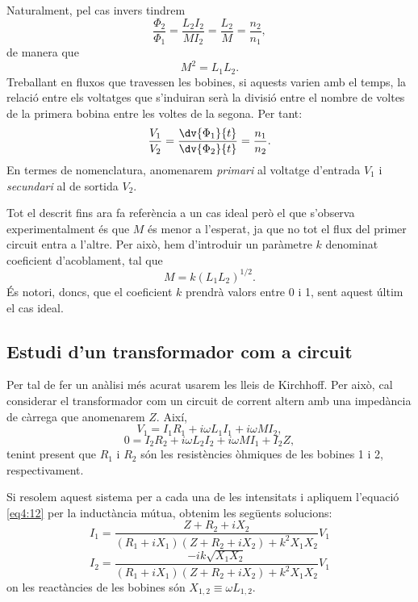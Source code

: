 \documentclass[a4paper,10.5pt]{report}
\begin{document}
Naturalment, pel cas invers tindrem
\begin{equation}
	\frac{\Phi_2}{\Phi_1}=\frac{L_2I_2}{MI_2}=\frac{L_2}{M}=\frac{n_2}{n_1}, \label{eq:4:9}
\end{equation}
de manera que
\begin{equation}
	M^2=L_1L_2. \label{eq:4:10}
\end{equation}
Treballant en fluxos que travessen les bobines, si aquests varien amb el temps, la relació entre els voltatges que s'induiran serà la divisió entre el nombre de voltes de la primera bobina entre les voltes de la segona. Per tant:
\begin{equation}
	\frac{V_1}{V_2}=\frac{\dv{\Phi_1}{t}}{\dv{\Phi_2}{t}}=\frac{n_1}{n_2}. \label{eq4:11}
\end{equation}
En termes de nomenclatura, anomenarem \textit{primari} al voltatge d'entrada $V_1$ i \textit{secundari} al de sortida $V_2$.

Tot el descrit fins ara fa referència a un cas ideal però el que s'observa experimentalment és que $M$ és menor a l'esperat, ja que no tot el flux del primer circuit entra a l'altre. Per això, hem d'introduir un paràmetre $k$ denominat coeficient d'acoblament, tal que
\begin{equation}
	M=k(L_1L_2)^{1/2}. \label{eq4:12}
\end{equation}
És notori, doncs, que el coeficient $k$ prendrà valors entre 0 i 1, sent aquest últim el cas ideal.

\subsection{Estudi d'un transformador com a circuit}
Per tal de fer un anàlisi més acurat usarem les lleis de Kirchhoff. Per això, cal considerar el transformador com un circuit de corrent altern amb una impedància de càrrega que anomenarem $Z$. Així,
\begin{equation}
	V_1 = I_1 R_1 + i \omega L_1 I_1 + i \omega M I_2 \label{eq4:13},
\end{equation}
\begin{equation}
	0 = I_2 R_2 + i \omega L_2 I_2 + i \omega M I_1 + I_2 Z \label{eq4:14},
\end{equation}
tenint present que $R_1$ i $R_2$ són les resistències òhmiques de les bobines 1 i 2, respectivament.

Si resolem aquest sistema per a cada una de les intensitats i apliquem l'equació \eqref{eq4:12} per la inductància mútua, obtenim les següents solucions:
\begin{equation}
	I_1 = \frac{Z + R_2 + iX_2}{(R_1 + iX_1)(Z + R_2 + iX_2) + k^2 X_1 X_2} V_1 \label{eq4:15}
\end{equation}
\begin{equation}
	I_2 = \frac{-ik\sqrt{X_1 X_2}}{(R_1 + iX_1)(Z + R_2 + iX_2) + k^2 X_1 X_2} V_1 \label{eq4:16}
\end{equation}
on les reactàncies de les bobines són $X_{1,2} \equiv \omega L_{1,2}$.
\end{document}
